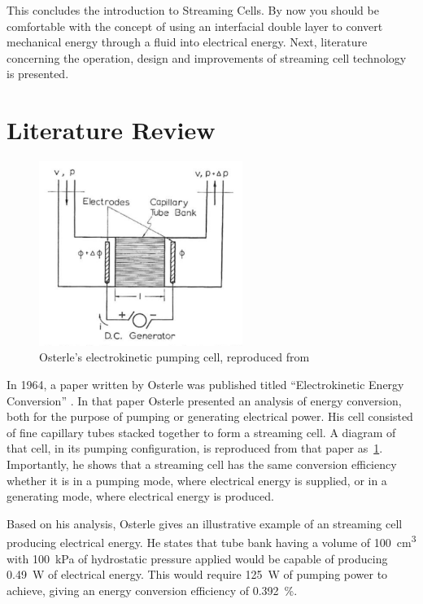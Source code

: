     This concludes the introduction to Streaming Cells.
    By now you should be comfortable with the concept of using an interfacial double layer to convert mechanical energy through a fluid into electrical energy.
    Next, literature concerning the operation, design and improvements of streaming cell technology is presented.

  \section{Literature Review}

    \begin{figure}
      \centering
      \includegraphics[height=6cm]{content/pt1/Osterle_ElectrokineticCell.png}
      \caption{\label{fig:Osterle_cell}Osterle's electrokinetic pumping cell, reproduced from \cite{Osterle1964}}
    \end{figure}

    In 1964, a paper written by Osterle was published titled ``Electrokinetic Energy Conversion'' \cite{Osterle1964}.
    In that paper Osterle presented an analysis of energy conversion, both for the purpose of pumping or generating electrical power.
    His cell consisted of fine capillary tubes stacked together to form a streaming cell.
    A diagram of that cell, in its pumping configuration, is reproduced from that paper as~\cref{fig:Osterle_cell}.
    Importantly, he shows that a streaming cell has the same conversion efficiency whether it is in a pumping mode, where electrical energy is supplied, or in a generating mode, where electrical energy is produced.

    Based on his analysis, Osterle gives an illustrative example of an streaming cell producing electrical energy.
    He states that tube bank having a volume of \SI{100}{\centi\meter\cubed} with \SI{100}{\kilo\pascal} of hydrostatic pressure applied would be capable of producing \SI{0.49}{\watt} of electrical energy.
    This would require \SI{125}{\watt} of pumping power to achieve, giving an energy conversion efficiency of \SI{0.392}{\percent}.

